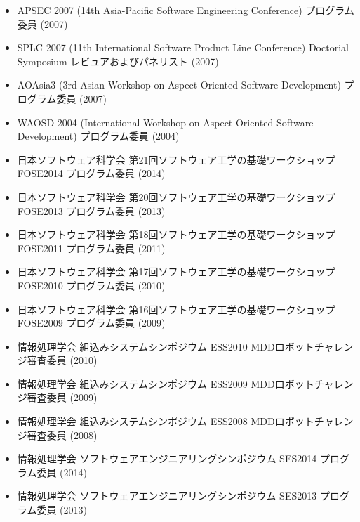 \documentclass{jarticle}
\begin{document}
\begin{itemize}
\item APSEC 2007 (14th Asia-Pacific Software Engineering Conference) プログラム委員 (2007)

\item SPLC 2007 (11th International Software Product Line Conference) Doctorial Symposium レビュアおよびパネリスト (2007)

\item AOAsia3 (3rd Asian Workshop on Aspect-Oriented Software Development) プログラム委員 (2007)

\item WAOSD 2004 (International Workshop on Aspect-Oriented Software Development) プログラム委員 (2004)
\end{itemize}

\begin{itemize}
\item 日本ソフトウェア科学会 第21回ソフトウェア工学の基礎ワークショップ FOSE2014 プログラム委員 (2014)

\item 日本ソフトウェア科学会 第20回ソフトウェア工学の基礎ワークショップ FOSE2013 プログラム委員 (2013)

\item 日本ソフトウェア科学会 第18回ソフトウェア工学の基礎ワークショップ FOSE2011 プログラム委員 (2011)

\item 日本ソフトウェア科学会 第17回ソフトウェア工学の基礎ワークショップ FOSE2010 プログラム委員 (2010)

\item 日本ソフトウェア科学会 第16回ソフトウェア工学の基礎ワークショップ FOSE2009 プログラム委員 (2009)

\item 情報処理学会 組込みシステムシンポジウム ESS2010 MDDロボットチャレンジ審査委員 (2010)

\item 情報処理学会 組込みシステムシンポジウム ESS2009 MDDロボットチャレンジ審査委員 (2009)

\item 情報処理学会 組込みシステムシンポジウム ESS2008 MDDロボットチャレンジ審査委員 (2008)

\item 情報処理学会 ソフトウェアエンジニアリングシンポジウム SES2014 プログラム委員 (2014)

\item 情報処理学会 ソフトウェアエンジニアリングシンポジウム SES2013 プログラム委員 (2013)


\end{itemize}
\end{document}
